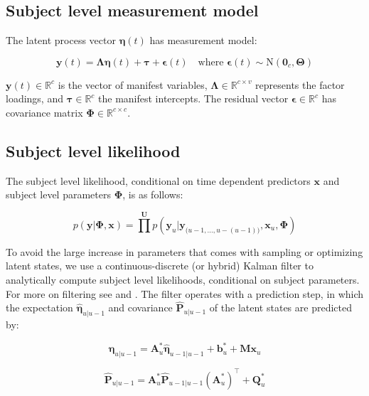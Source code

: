 \documentclass[nojss]{jss}\usepackage[]{graphicx}\usepackage[]{color}
\newcommand{\vect}[1]{\boldsymbol{\mathbf{#1}}}
\begin{document}
\subsection{Subject level measurement model}
The latent process vector $\vect{\eta}(t)$ has measurement model:

\begin{equation}
	\label{eq:measurement}
	\vect{y}(t) = \vect{\Lambda} \vect{\eta}(t) + \vect{\tau} + \vect{\epsilon}(t)  
	\quad \text{where } \vect{\epsilon}(t) \sim  \mathrm{N} (\vect{0}_c, \vect{\Theta})
\end{equation}

$\vect{y} (t)\in\mathbb{R}^{c}$ is the vector of manifest variables, $\vect{\Lambda} \in \mathbb{R}^{c \times v}$ represents the factor loadings, and $\vect{\tau} \in\mathbb{R}^{c}$ the manifest intercepts. The residual vector $\vect{\epsilon} \in \mathbb{R}^{c}$ has covariance matrix $\vect{\Phi} \in\mathbb{R}^{c \times c}$.


\subsection{Subject level likelihood}
The subject level likelihood, conditional on time dependent predictors $\vect{x}$ and subject level parameters $\vect{\Phi}$, is as follows:

\begin{equation}
	p(\vect{y} | \vect{\Phi}, \vect{x}) = \prod^{\vect{U}} p(\vect{y}_u | \vect{y}_{\big(u-1,...,u-(u-1)\big)}, \vect{x}_u, \vect{\Phi})
\end{equation}

To avoid the large increase in parameters that comes with sampling or optimizing latent states, we use a continuous-discrete (or hybrid) Kalman filter \citep{kalman1961new} to analytically compute subject level likelihoods, conditional on subject parameters. For more on filtering see \citet{jazwinski2007stochastic} and \citet{sarkka2013Bayesian}. The filter operates with a prediction step, in which the expectation $\hat{\vect{\eta}}_{u|u-1}$ and covariance $\hat{\vect{P}}_{u|u-1}$ of the latent states are predicted by:

\begin{equation}
	\hat{\vect{\eta}}_{u|u-1} = \vect{A}^*_u \hat{\vect{\eta}}_{u-1|u-1} + \vect{b}^*_u + \vect{M}\vect{x}_u 
\end{equation}

\begin{equation}
	\hat{\vect{P}}_{u|u-1} = \vect{A}^*_u \hat{\vect{P}}_{u-1|u-1} (\vect{A}^*_u)^{\top}+ \vect{Q}^*_u
\end{equation}
\end{document}
